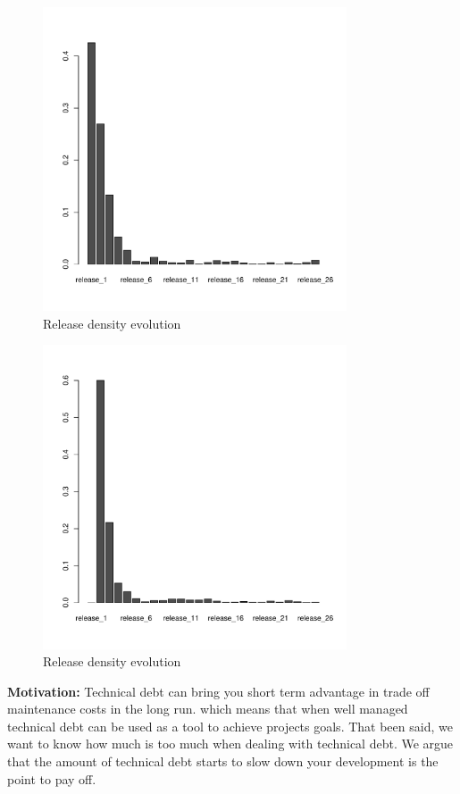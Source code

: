 \begin{figure}[thb!]
    \caption{Release density evolution}
    \label{fig:release_density}
    \includegraphics[width=90mm,scale=0.5]{figures/r1}
\end{figure}

\begin{figure}[thb!]
    \caption{Release density evolution}
    \label{fig:release_density}
    \includegraphics[width=90mm,scale=0.5]{figures/r2}
\end{figure}

\vspace{3mm}
\noindent\rqii
\vspace{3mm}

\noindent\textbf{Motivation:} Technical debt can bring you short term advantage in trade off maintenance costs in the  long run. which means that when well managed technical debt can be used as a tool to achieve projects goals. That been said, we want to know how much is too much when dealing with technical debt. We argue that the amount of technical debt starts to slow down your development is the point to pay off. 

